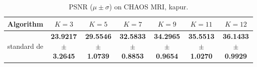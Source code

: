 \begin{table}[htbp]
\centering
\caption{PSNR ($\mu \pm \sigma$) on CHAOS MRI, kapur.}
\label{tab:exp2-kapur-psnr}
\begin{tabular}{lcccccc}
\toprule
Algorithm & $K=3$ & $K=5$ & $K=7$ & $K=9$ & $K=11$ & $K=12$ \\
\midrule
standard de & \textbf{23.9217 $\pm$ 3.2645} & \textbf{29.5546 $\pm$ 1.0739} & \textbf{32.5833 $\pm$ 0.8853} & \textbf{34.2965 $\pm$ 0.9654} & \textbf{35.5513 $\pm$ 1.0270} & \textbf{36.1433 $\pm$ 0.9929} \\
\bottomrule
\end{tabular}
\end{table}